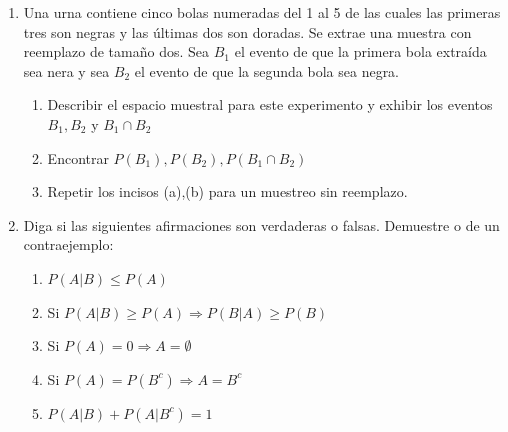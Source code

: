 \documentclass[12pt,a4paper]{report}
\begin{document}
\begin{enumerate}
   \item {
  Una urna contiene cinco bolas numeradas del 1 al 5 de las cuales las primeras tres son negras y las últimas dos son doradas. Se extrae una muestra con reemplazo de tamaño dos. Sea $B_{1}$ el evento de que la primera bola extraída sea nera y sea $B_{2}$ el evento de que la segunda bola sea negra.
\begin{enumerate}[label=\alph*) ]
	\item{Describir el espacio muestral para este experimento y exhibir los eventos $B_{1},B_{2}$ y $B_{1}\cap B_{2}$ \\

	}

	\item{Encontrar $P(B_{1}),P(B_{2}),P(B_{1}\cap B_{2})$\\

	}

	\item{Repetir los incisos (a),(b) para un muestreo sin reemplazo. \\

	}



\end{enumerate}

	}

   \item {
    Diga si las siguientes afirmaciones son verdaderas o falsas. Demuestre o de un contraejemplo:\\

    \begin{enumerate}[label=\alph*) ]
	\item{ $P(A|B) \leq P(A)$\\

	}

	\item{Si $P(A|B) \geq P(A) \Rightarrow P(B|A)\geq P(B)$\\

	}

	\item{Si $P(A)=0 \Rightarrow A= \emptyset$ \\

	}

	\item{Si $P(A)=P(B^c) \Rightarrow A=B^c$}\\

	\item{$P(A|B) + P(A|B^c)=1$}\\


\end{enumerate}}
\end{enumerate}
\end{document}
